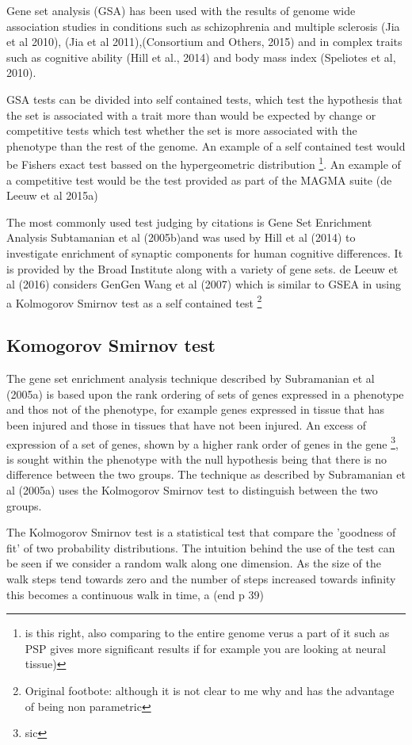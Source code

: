 Gene set analysis (GSA) has been used with the results of genome wide association studies in conditions such as schizophrenia and multiple sclerosis (Jia et al 2010), (Jia et al 2011),(Consortium and Others, 2015) and in complex traits such as cognitive ability (Hill et al., 2014) and body mass index (Speliotes et al, 2010).

GSA tests can be divided into self contained tests, which test the hypothesis that the set is associated with a trait more than would be expected by change or competitive tests which test whether the set is more associated with the phenotype than the rest of the genome. An example of a self contained test would be Fishers exact test bassed on the hypergeometric distribution \footnote{is this right, also comparing to the entire genome verus a part of it such as PSP gives more significant results if for example you are looking at neural tissue)}. An example of a competitive test would be the test provided as part of the MAGMA suite (de Leeuw et al 2015a)

The most commonly used test judging by citations is Gene Set Enrichment Analysis Subtamanian et al (2005b)and was used by Hill et al (2014) to investigate enrichment of synaptic components for human cognitive differences. It is provided by the Broad Institute along with a variety of gene sets. de Leeuw et al (2016) considers GenGen Wang et al (2007) which is similar to GSEA in using a Kolmogorov Smirnov test as a self contained test \footnote{Original footbote: although it is not clear to me why and has the advantage of being non parametric}

\subsection{Komogorov Smirnov test}

The gene set enrichment analysis technique described by Subramanian et al (2005a) is based upon the rank ordering of sets of genes expressed in a phenotype and thos not of the phenotype, for example genes expressed in tissue that has been injured and those in tissues that have not been injured. An excess of expression of a set of genes, shown by a higher rank order of genes in the gene \footnote{sic}, is sought within the phenotype with the null hypothesis being that there is no difference between the two groups. The technique as described by Subramanian et al (2005a) uses the Kolmogorov Smirnov test to distinguish between the two groups. 

The Kolmogorov Smirnov test is a statistical test that compare the 'goodness of fit' of two probability distributions. The intuition behind the use of the test can be seen if we consider a random walk along one dimension. As the size of the walk steps tend towards zero and the number of steps increased towards infinity this becomes a continuous walk in time, a (end p 39)


